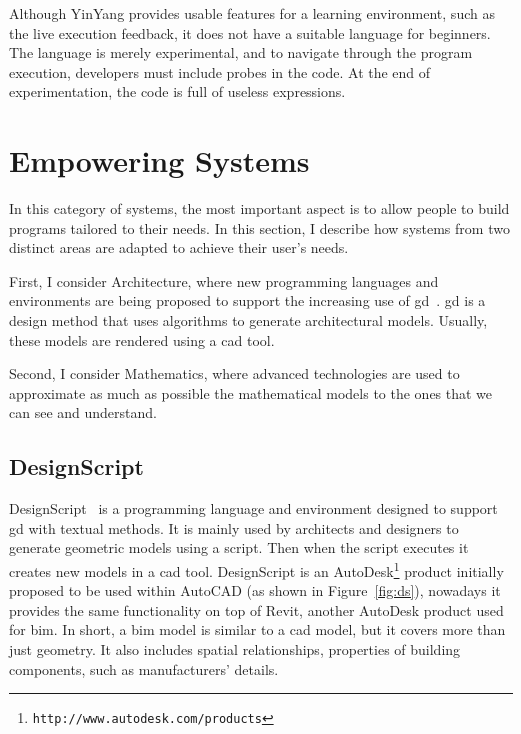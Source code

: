 Although YinYang provides usable features for a learning environment, such as the live execution feedback, it does not have a suitable language for beginners. The language is merely experimental, and to navigate through the program execution, developers must include probes in the code. At the end of experimentation, the code is full of useless expressions.

\section{Empowering Systems}
\label{sec:es}
In this category of systems, the most important aspect is to allow people to build programs tailored to their needs. In this section, I describe how systems from two distinct areas are adapted to achieve their user's needs. 

First, I consider Architecture, where new programming languages and environments are being proposed to support the increasing use of \gls{gd}~\citep{mccormack2004generative}. \gls{gd} is a design method that uses algorithms to generate architectural models. Usually, these models are rendered using a \gls{cad} tool. 

Second, I consider Mathematics, where advanced technologies are used to approximate as much as possible the mathematical models to the ones that we can see and understand.

\subsection{DesignScript}
\label{subsec:designscript}
DesignScript~\citep{aish2012designscript} is a programming language and environment designed to support \gls{gd} with textual methods. It is mainly used by architects and designers to generate geometric models using a script. Then when the script executes it creates new models in a \gls{cad} tool. DesignScript is an AutoDesk\footnote{\texttt{http://www.autodesk.com/products}} product initially proposed to be used within AutoCAD (as shown in Figure~\ref{fig:ds}), nowadays it provides the same functionality on top of Revit, another AutoDesk product used for \gls{bim}. In short, a \gls{bim} model is similar to a \gls{cad} model, but it covers more than just geometry. It also includes spatial relationships, properties of building components, such as manufacturers' details.

